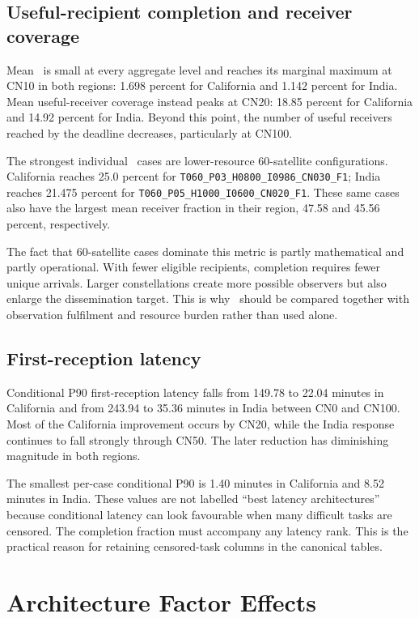 \subsection{Useful-recipient completion and receiver coverage}

Mean \Suseful\ is small at every aggregate level and reaches its marginal maximum at CN10 in both regions: 1.698 percent for California and 1.142 percent for India. Mean useful-receiver coverage instead peaks at CN20: 18.85 percent for California and 14.92 percent for India. Beyond this point, the number of useful receivers reached by the deadline decreases, particularly at CN100.

The strongest individual \Suseful\ cases are lower-resource 60-satellite configurations. California reaches 25.0 percent for \texttt{T060\_P03\_H0800\_I0986\_CN030\_F1}; India reaches 21.475 percent for \texttt{T060\_P05\_H1000\_I0600\_CN020\_F1}. These same cases also have the largest mean receiver fraction in their region, 47.58 and 45.56 percent, respectively.

The fact that 60-satellite cases dominate this metric is partly mathematical and partly operational. With fewer eligible recipients, completion requires fewer unique arrivals. Larger constellations create more possible observers but also enlarge the dissemination target. This is why \Suseful\ should be compared together with observation fulfilment and resource burden rather than used alone.

\subsection{First-reception latency}

Conditional P90 first-reception latency falls from 149.78 to 22.04 minutes in California and from 243.94 to 35.36 minutes in India between CN0 and CN100. Most of the California improvement occurs by CN20, while the India response continues to fall strongly through CN50. The later reduction has diminishing magnitude in both regions.

The smallest per-case conditional P90 is 1.40 minutes in California and 8.52 minutes in India. These values are not labelled ``best latency architectures'' because conditional latency can look favourable when many difficult tasks are censored. The completion fraction must accompany any latency rank. This is the practical reason for retaining censored-task columns in the canonical tables.

\section{Architecture Factor Effects}


